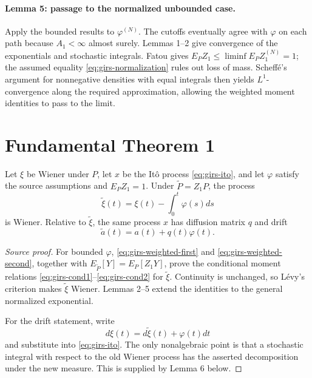 \paragraph{Lemma 5: passage to the normalized unbounded case.}
Apply the bounded results to \(\varphi^{(N)}\).  The cutoffs eventually agree with \(\varphi\) on
each path because \(A_1<\infty\) almost surely.  Lemmas 1--2 give convergence of the exponentials
and stochastic integrals.  Fatou gives
\(E_P Z_1\le\liminf E_P Z^{(N)}_1=1\); the assumed equality
\eqref{eq:girs-normalization} rules out loss of mass.  Scheff\'e's argument for nonnegative densities
with equal integrals then yields \(L^1\)-convergence along the required approximation, allowing the
weighted moment identities to pass to the limit.

\section{Fundamental Theorem 1}
\begin{theorem}
Let \(\xi\) be Wiener under \(P\), let \(x\) be the It\^o process
\eqref{eq:girs-ito}, and let \(\varphi\) satisfy the source assumptions and
\(E_PZ_1=1\).  Under \(\widetilde P=Z_1P\), the process
\[
 \widetilde\xi(t)=\xi(t)-\int_0^t\varphi(s)ds
\]
is Wiener.  Relative to \(\widetilde\xi\), the same process \(x\) has diffusion matrix \(q\) and
drift
\begin{equation}\label{eq:girs-drift-shift}
 \widetilde a(t)=a(t)+q(t)\varphi(t).
\end{equation}
\end{theorem}

\begin{proof}[Source proof]
For bounded \(\varphi\), \eqref{eq:girs-weighted-first} and
\eqref{eq:girs-weighted-second}, together with
\(E_{\widetilde P}[Y]=E_P[Z_1Y]\), prove the conditional moment relations
\eqref{eq:girs-cond1}--\eqref{eq:girs-cond2} for \(\widetilde\xi\).  Continuity is unchanged, so
L\'evy's criterion makes \(\widetilde\xi\) Wiener.  Lemmas 2--5 extend the identities to the general
normalized exponential.

For the drift statement, write
\[
 d\xi(t)=d\widetilde\xi(t)+\varphi(t)dt
\]
and substitute into \eqref{eq:girs-ito}.  The only nonalgebraic point is that a stochastic integral
with respect to the old Wiener process has the asserted decomposition under the new measure.  This
is supplied by Lemma 6 below.
\end{proof}

